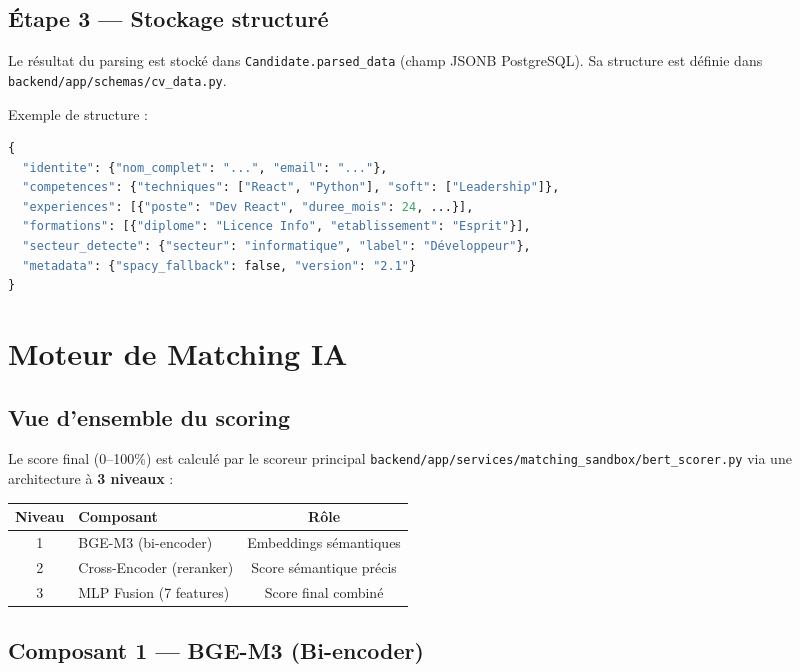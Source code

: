 \documentclass[12pt,a4paper]{report}
\newcommand{\filepath}[1]{\texttt{\small\textcolor{codeblue}{#1}}}
\begin{document}
\section{Étape 3 — Stockage structuré}

Le résultat du parsing est stocké dans \texttt{Candidate.parsed\_data}
(champ JSONB PostgreSQL). Sa structure est définie dans
\filepath{backend/app/schemas/cv\_data.py}.

Exemple de structure :
\begin{lstlisting}[language=Python]
{
  "identite": {"nom_complet": "...", "email": "..."},
  "competences": {"techniques": ["React", "Python"], "soft": ["Leadership"]},
  "experiences": [{"poste": "Dev React", "duree_mois": 24, ...}],
  "formations": [{"diplome": "Licence Info", "etablissement": "Esprit"}],
  "secteur_detecte": {"secteur": "informatique", "label": "Développeur"},
  "metadata": {"spacy_fallback": false, "version": "2.1"}
}
\end{lstlisting}

\chapter{Moteur de Matching IA}

\section{Vue d'ensemble du scoring}

Le score final (0–100\%) est calculé par le scoreur principal
\filepath{backend/app/services/matching\_sandbox/bert\_scorer.py}
via une architecture à \textbf{3 niveaux} :

\begin{center}
\begin{tabular}{clc}
\toprule
\textbf{Niveau} & \textbf{Composant} & \textbf{Rôle} \\
\midrule
1 & BGE-M3 (bi-encoder) & Embeddings sémantiques \\
2 & Cross-Encoder (reranker) & Score sémantique précis \\
3 & MLP Fusion (7 features) & Score final combiné \\
\bottomrule
\end{tabular}
\end{center}

\section{Composant 1 — BGE-M3 (Bi-encoder)}
\end{document}
